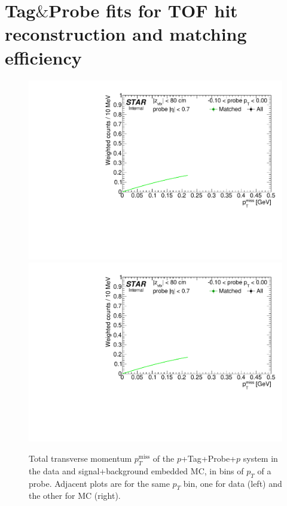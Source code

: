 
\chapter{Tag\texorpdfstring{$\&$}{&}Probe fits for TOF hit reconstruction and matching efficiency}\label{appendix:tagAndProbeTofEff}

 
\begin{figure}[h!]
\caption[Tag\&Probe fits to $p_{T}^{\text{miss}}$ in bins of probe $p_{T}$.]{Total transverse momentum $p_{T}^{\text{miss}}$ of the $p$+Tag+Probe+$p$ system in the data and signal+background embedded MC, in bins of $p_{T}$ of a probe. Adjacent plots are for the same $p_{T}$ bin, one for data (left) and the other for MC (right).}\label{fig:tagAndProbeTofEffFits_Pt}
\centering
\parbox{0.24\textwidth}{ 
  \centering
  \includegraphics[width=\linewidth,page=5]{graphics/correctionsToEff/TOF_tagAndProbe/Fitting_effVsPt_data.CPT2.pdf}\\
  \includegraphics[width=\linewidth,page=7]{graphics/correctionsToEff/TOF_tagAndProbe/Fitting_effVsPt_data.CPT2.pdf}\\
}
\end{figure}
